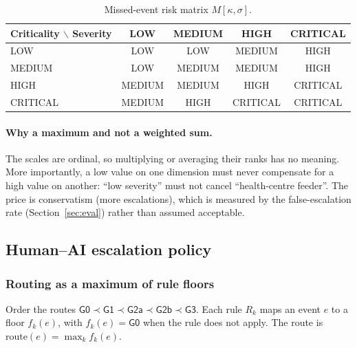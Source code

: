 \documentclass[11pt,a4paper]{article}
\renewcommand{\_}{\textunderscore\allowbreak}
\newcommand{\lvl}[1]{\textsf{#1}}
\begin{document}
\begin{table}[H]
\centering\small
\begin{tabular}{@{}lcccc@{}}
\toprule
\textbf{Criticality $\backslash$ Severity} & \textbf{LOW} & \textbf{MEDIUM} & \textbf{HIGH} & \textbf{CRITICAL} \\
\midrule
LOW & LOW & LOW & MEDIUM & HIGH \\
MEDIUM & LOW & MEDIUM & MEDIUM & HIGH \\
HIGH & MEDIUM & MEDIUM & HIGH & CRITICAL \\
CRITICAL & MEDIUM & HIGH & CRITICAL & CRITICAL \\
\bottomrule
\end{tabular}
\caption{Missed-event risk matrix $M[\kappa,\sigma]$.}
\label{tab:matrix}
\end{table}

\paragraph{Why a maximum and not a weighted sum.} The scales are ordinal, so multiplying or averaging their ranks
has no meaning. More importantly, a low value on one dimension must never compensate for a high value on
another: ``low severity'' must not cancel ``health-centre feeder''. The price is conservatism (more
escalations), which is measured by the false-escalation rate (Section~\ref{sec:eval}) rather than assumed
acceptable.

\subsection{Human--AI escalation policy}
\label{sec:policy}

\subsubsection{Routing as a maximum of rule floors}
Order the routes $\lvl{G0}\prec\lvl{G1}\prec\lvl{G2a}\prec\lvl{G2b}\prec\lvl{G3}$. Each rule $R_k$ maps an
event $e$ to a floor $f_k(e)$, with $f_k(e)=\lvl{G0}$ when the rule does not apply. The route is
$\mathrm{route}(e)=\max_k f_k(e)$.
\end{document}

